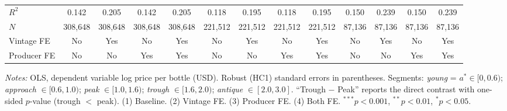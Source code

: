 \begin{table}[htbp]
{\begin{tabular}{lcccccccccccc}
\midrule
$R^2$ & 0.142 & 0.205 & 0.142 & 0.205 & 0.118 & 0.195 & 0.118 & 0.195 & 0.150 & 0.239 & 0.150 & 0.239 \\
$N$ & 308,648 & 308,648 & 308,648 & 308,648 & 221,512 & 221,512 & 221,512 & 221,512 & 87,136 & 87,136 & 87,136 & 87,136 \\
Vintage FE & No & Yes & No & Yes & No & Yes & No & Yes & No & Yes & No & Yes \\
Producer FE & No & No & Yes & Yes & No & No & Yes & Yes & No & No & Yes & Yes \\
\bottomrule
\end{tabular}
}
\par\vspace{4pt}
{\footnotesize\textit{Notes:} OLS, dependent variable log price per bottle (USD). Robust (HC1) standard errors in parentheses. Segments: \textit{young} = $a^* \in [0, 0.6)$; \textit{approach} $\in [0.6, 1.0)$; \textit{peak} $\in [1.0, 1.6)$; \textit{trough} $\in [1.6, 2.0)$; \textit{antique} $\in [2.0, 3.0]$. ``Trough $-$ Peak'' reports the direct contrast with one-sided $p$-value (trough $<$ peak). (1) Baseline. (2) Vintage FE. (3) Producer FE. (4) Both FE. $^{***}p<0.001$, $^{**}p<0.01$, $^{*}p<0.05$.}
\end{table}
